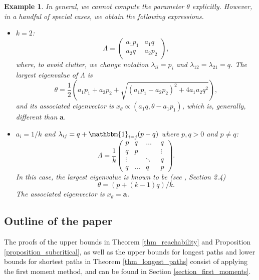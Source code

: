 \documentclass[11pt]{article}
\numberwithin{equation}{section}
\DeclareMathOperator{\indicatrice}{\mathbbm{1}}
\newtheorem{example}[theorem]{Example}
\theoremstyle{definition}
\begin{document}
\begin{example}\label{example_explicit}
In general, we cannot compute the parameter $\theta$ explicitly. However, in a handful of special cases, we obtain the following expressions.
\begin{itemize}
	\item $k=2$: 
	\begin{equation*}
	\Lambda =
	\begin{pmatrix}
	a_1p_1 & a_1q \\
	a_2q & a_2 p_2
	\end{pmatrix},
	\end{equation*}
	where, to avoid clutter, we change notation $\lambda_{ii} = p_i$ and $\lambda_{12} = \lambda_{21} = q$. The largest eigenvalue of $\Lambda$ is
	$$\theta = \frac{1}{2}\left(a_1 p_1+a_2 p_2 + \sqrt{(a_1 p_1-a_2 p_2)^2+4a_1 a_2 q^2}\right),$$
	and its associated eigenvector is $x_\theta \propto (a_1q,\theta - a_1p_1)$, which is, generally, different than $\boldsymbol{a}$.

	\item $a_i = 1/k$ and $\lambda_{ij} = q+\indicatrice_{i=j}(p-q)$ where $p,q > 0$ and $p\neq q$: 
	\begin{equation*}
	\Lambda = \frac{1}{k}
	\begin{pmatrix}
	p & q & \ldots & q \\
	q & p &  & \vdots \\
	\vdots &  & \ddots\textrm{ } & q \\
	q & \ldots & q & p
	\end{pmatrix}.
	\end{equation*}
	In this case, the largest eigenvalue is known to be (see \cite{A18}, Section 2.4)
	$$ \theta = (p+(k-1)q)/k. $$
	The associated eigenvector is $x_\theta = \boldsymbol{a}$. 
\end{itemize}
\end{example}

\subsection{Outline of the paper}

The proofs of the upper bounds in Theorem \ref{thm_reachability} and Proposition \ref{proposition_subcritical}, as well as the upper bounds for longest paths and lower bounds for shortest paths in Theorem \ref{thm_longest_paths} consist of applying the first moment method, and can be found in Section \ref{section_first_moments}.
\end{document}
